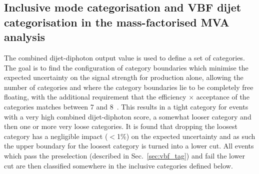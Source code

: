 
\subsection{Inclusive mode categorisation and VBF dijet categorisation in the mass-factorised \acs{MVA} analysis}
\label{sec:inclusive_cats_massfac}

The combined dijet-diphoton \BDT output value is used to define a set of \VBF categories. The goal is to find the configuration of category boundaries which minimise the expected uncertainty on the signal strength for \VBF production alone, allowing the number of categories and where the category boundaries lie to be completely free floating, with the additional requirement that the efficiency $\times$ acceptance of the categories matches between 7 and 8~\TeV. This results in a tight \VBF category for events with a very high combined dijet-diphoton \BDT score, a somewhat looser category and then one or more very loose categories. It is found that dropping the loosest category has a negligible impact ($<$1\%) on the expected uncertainty and as such the upper boundary for the loosest category is turned into a lower cut. All events which pass the \VBF preselection (described in Sec.~\ref{sec:vbf_tag}) and fail the lower cut are then classified somewhere in the inclusive categories defined below. 

